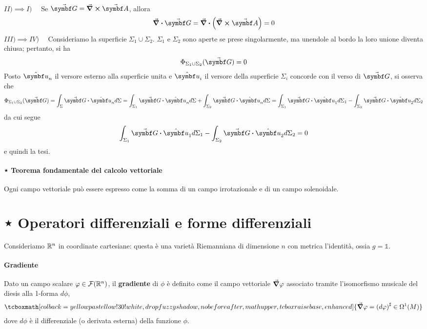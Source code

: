 \begin{demonstration}~\\%
	$II)\implies I)\quad$ Se $\vba{G}=\curl{\vba{A}}$, allora
	\begin{equation*}
		\div{\vba{G}}=\div{\left(\curl{\vba{A}}\right)}=0
	\end{equation*}
	$III) \implies IV)\quad$ Consideriamo la superficie $\Sigma_1\cup\Sigma_2$. $\Sigma_1$ e $\Sigma_2$ sono aperte se prese singolarmente, ma unendole al bordo la loro unione diventa chiusa; pertanto, si ha
	\begin{equation*}
		\Phi_{\Sigma_1\cup\Sigma_2}(\vba{G})=0
	\end{equation*}
	Posto $\vbh{u}_n$ il versore esterno alla superficie unita e $\vbh{u}_i$ il versore della superficie $\Sigma_i$ concorde con il verso di $\vba{G}$, si osserva che
	\begin{equation*}
		\Phi_{\Sigma_1\cup\Sigma_2}(\vba{G})=\int_{\Sigma}\vba{G}\vdot\vbh{u}_nd\Sigma=\int_{\Sigma_1}\vba{G}\vdot\vbh{u}_nd\Sigma+\int_{\Sigma_2}\vba{G}\vdot\vbh{u}_nd\Sigma=\int_{\Sigma_1}\vba{G}\vdot\vbh{u}_1d\Sigma_1-\int_{\Sigma_2}\vba{G}\vdot\vbh{u}_2d\Sigma_2
	\end{equation*}
da cui segue
\begin{equation*}
	\int_{\Sigma_1}\vba{G}\vdot\vbh{u}_1d\Sigma_1-\int_{\Sigma_2}\vba{G}\vdot\vbh{u}_2d\Sigma_2=0
\end{equation*}
e quindi la tesi.
\end{demonstration}
\paragraph{⋆ Teorema fondamentale del calcolo vettoriale}
\begin{theoremaqed}
	Ogni campo vettoriale può essere espresso come la somma di un campo irrotazionale e di un campo solenoidale.
\end{theoremaqed}
\section{⋆ Operatori differenziali e forme differenziali}
Consideriamo $\mathbb{R}^n$ in coordinate cartesiane: questa è una varietà Riemanniana di dimensione $n$ con metrica l'identità, ossia $g=\mathbb{1}$.\\
\paragraph{Gradiente}
Dato un campo scalare $\varphi\in\mathcal{F}(\mathbb{R}^n)$, il \textbf{gradiente} di $\phi$ è definito come il campo vettoriale $\grad{\varphi}$ associato tramite l'isomorfismo musicale del diesis alla 1-forma $d\phi$,
\begin{equation}
	\tcboxmath[colback=yellowpastellow!30!white,drop fuzzy shadow, nobeforeafter, math upper, tcbox raise base, enhanced]{\grad{\phi}=\left(d\phi\right)^{\sharp}\in\Omega^1(M)}
\end{equation}
dove $d\phi$ è il differenziale (o derivata esterna) della funzione $\phi$.
